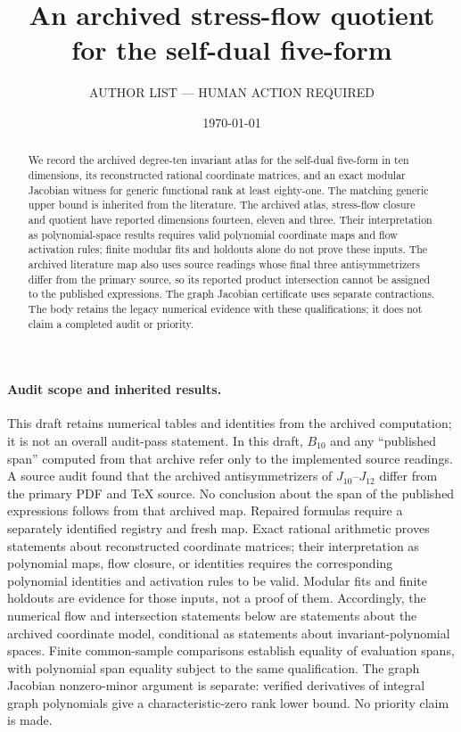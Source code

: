 \documentclass[aps,prl,reprint,superscriptaddress,nofootinbib,floatfix]{revtex4-2}
\begin{document}
\title{An archived stress-flow quotient for the self-dual five-form}

\author{AUTHOR LIST --- HUMAN ACTION REQUIRED}

\date{\today}

\begin{abstract}
We record the archived degree-ten invariant atlas for the self-dual
five-form in ten dimensions, its reconstructed rational coordinate matrices,
and an exact modular Jacobian witness for generic functional rank at least
eighty-one. The matching generic upper bound is inherited from the literature.
The archived atlas, stress-flow closure and quotient have reported dimensions
fourteen, eleven and three. Their interpretation as polynomial-space results
requires valid polynomial coordinate maps and flow activation rules; finite
modular fits and holdouts alone do not prove these inputs. The archived
literature map also uses source readings whose final three antisymmetrizers
differ from the primary source, so its reported product intersection cannot
be assigned to the published expressions. The graph Jacobian certificate uses
separate contractions. The body retains the legacy numerical evidence with
these qualifications; it does not claim a completed audit or priority.
\end{abstract}

\maketitle

\paragraph{Audit scope and inherited results.}
This draft retains numerical tables and identities from the archived computation;
it is not an overall audit-pass statement. In this draft, $B_{10}$ and any
``published span'' computed from that archive refer only to the implemented
source readings. A source audit found that the archived antisymmetrizers of
$J_{10}$--$J_{12}$ differ from the primary PDF and TeX source. No conclusion
about the span of the published expressions follows from that archived map.
Repaired formulas require a separately identified registry and fresh map.
Exact rational arithmetic proves statements about reconstructed coordinate
matrices; their interpretation as polynomial maps, flow closure, or identities
requires the corresponding polynomial identities and activation rules to be
valid. Modular fits and finite holdouts are evidence for those inputs, not a
proof of them. Accordingly, the numerical flow and intersection statements
below are statements about the archived coordinate model, conditional as
statements about invariant-polynomial spaces. Finite common-sample comparisons
establish equality of evaluation spans, with polynomial span equality subject
to the same qualification. The graph Jacobian nonzero-minor argument is
separate: verified derivatives of integral graph polynomials give a
characteristic-zero rank lower bound. No priority claim is made.
\end{document}
